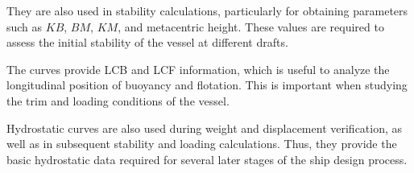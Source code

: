 \documentclass[12pt,a4paper,twoside]{report}
\begin{document}
\vspace{\baselineskip}\par\noindent They are also used in stability calculations, particularly for obtaining parameters such as \(KB\), \(BM\), \(KM\), and metacentric height. These values are required to assess the initial stability of the vessel at different drafts.

\vspace{\baselineskip}\par\noindent The curves provide LCB and LCF information, which is useful to analyze the longitudinal position of buoyancy and flotation. This is important when studying the trim and loading conditions of the vessel.

\vspace{\baselineskip}\par\noindent Hydrostatic curves are also used during weight and displacement verification, as well as in subsequent stability and loading calculations. Thus, they provide the basic hydrostatic data required for several later stages of the ship design process.\cite{roh2018shipstability}
\end{document}
